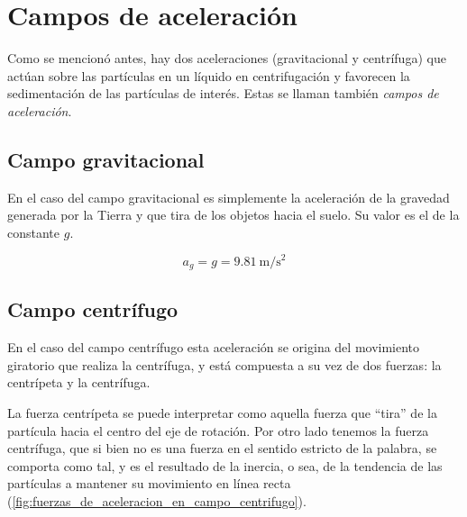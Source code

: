\documentclass{AsignaturaResumen}
\begin{document}
\section{Campos de aceleración}

Como se mencionó antes, hay dos aceleraciones (gravitacional y centrífuga) que actúan sobre las partículas en un líquido en centrifugación y favorecen la sedimentación de las partículas de interés. Estas se llaman también \emph{campos de aceleración}.



\subsection{Campo gravitacional}

En el caso del campo gravitacional es simplemente la aceleración de la gravedad generada por la Tierra y que tira de los objetos hacia el suelo. Su valor es el de la constante $g$.

\begin{equation}\label{eq:aceleracion_gravitacional}
    a_{g} = g = \qty{9.81}{\m\per\s\squared}
\end{equation}



\subsection{Campo centrífugo}


En el caso del campo centrífugo esta aceleración se origina del movimiento giratorio que realiza la centrífuga, y está compuesta a su vez de dos fuerzas: la centrípeta y la centrífuga.

La fuerza centrípeta se puede interpretar como aquella fuerza que ``tira'' de la partícula hacia el centro del eje de rotación. Por otro lado tenemos la fuerza centrífuga, que si bien no es una fuerza en el sentido estricto de la palabra, se comporta como tal, y es el resultado de la inercia, o sea, de la tendencia de las partículas a mantener su movimiento en línea recta (\autoref{fig:fuerzas_de_aceleracion_en_campo_centrifugo}). 
\end{document}
